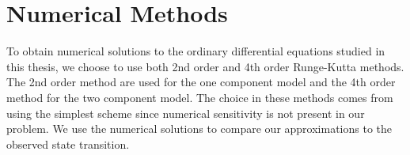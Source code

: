 \section*{Numerical Methods}

To obtain numerical solutions to the ordinary differential equations studied in this thesis, we choose to use both 2nd order and 4th order Runge-Kutta methods. The 2nd order method are used for the one component model and the 4th order method for the two component model. The choice in these methods comes from using the simplest scheme since numerical sensitivity is not present in our problem. We use the numerical solutions to compare our approximations to the observed state transition.